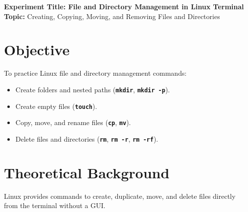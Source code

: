 \documentclass[10pt,a4paper]{article}
\newcommand{\cmd}[1]{\texttt{\textbf{#1}}}
\begin{document}
\raggedbottom
\thispagestyle{firstpage}

\begin{center}
  {\Large\bfseries\sffamily\color{primary} Experiment Title: File and Directory Management in Linux Terminal}\\[3pt]
  {\normalsize\sffamily\textbf{Topic:} Creating, Copying, Moving, and Removing Files and Directories}
\end{center}
\vspace{-4pt}

\section{Objective}
To practice Linux file and directory management commands:
\begin{itemize}[noitemsep,topsep=1pt,leftmargin=1.2em]
  \item Create folders and nested paths (\cmd{mkdir}, \cmd{mkdir -p}).
  \item Create empty files (\cmd{touch}).
  \item Copy, move, and rename files (\cmd{cp}, \cmd{mv}).
  \item Delete files and directories (\cmd{rm}, \cmd{rm -r}, \cmd{rm -rf}).
\end{itemize}

\section{Theoretical Background}
Linux provides commands to create, duplicate, move, and delete files directly from the terminal without a GUI.
\end{document}
